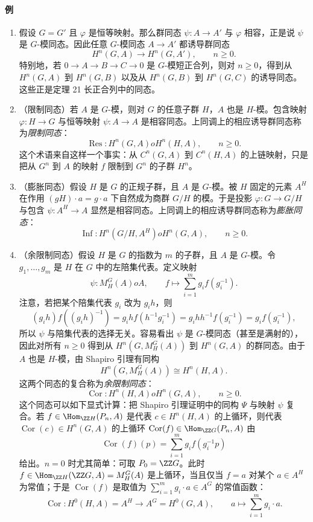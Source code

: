 \paragraph{例}
\begin{enumerate}[label=(\arabic*)]
  \item 假设 $G=G'$ 且 $\varphi$ 是恒等映射。那么群同态 $\psi:A\to A'$ 与 $\varphi$ 相容，正是说 $\psi$ 是 $G$-模同态。因此任意 $G$-模同态 $A\to A'$ 都诱导群同态
  \[
    H^n(G,A)\to H^n(G,A'),
    \qquad n\geq0.
  \]
  特别地，若 $0\to A\to B\to C\to0$ 是 $G$-模短正合列，则对 $n\geq0$，得到从 $H^n(G,A)$ 到 $H^n(G,B)$ 以及从 $H^n(G,B)$ 到 $H^n(G,C)$ 的诱导同态。这些正是定理 21 长正合列中的同态。

  \item （限制同态）若 $A$ 是 $G$-模，则对 $G$ 的任意子群 $H$，$A$ 也是 $H$-模。包含映射 $\varphi:H\to G$ 与恒等映射 $\psi:A\to A$ 是相容同态。上同调上的相应诱导群同态称为\emph{限制同态}：
  \[
    \operatorname{Res}:H^n(G,A)	o H^n(H,A),
    \qquad n\geq0.
  \]
  这个术语来自这样一个事实：从 $C^n(G,A)$ 到 $C^n(H,A)$ 的上链映射，只是把从 $G^n$ 到 $A$ 的映射 $f$ 限制到 $G^n$ 的子群 $H^n$。

  \item （膨胀同态）假设 $H$ 是 $G$ 的正规子群，且 $A$ 是 $G$-模。被 $H$ 固定的元素 $A^H$ 在作用 $(gH)\cdot a=g\cdot a$ 下自然成为商群 $G/H$ 的模。于是投影 $\varphi:G\to G/H$ 与包含 $\psi:A^H\to A$ 显然是相容同态。上同调上的相应诱导群同态称为\emph{膨胀同态}：
  \[
    \operatorname{Inf}:H^n(G/H,A^H)	o H^n(G,A),
    \qquad n\geq0.
  \]

  \item （余限制同态）假设 $H$ 是 $G$ 的指数为 $m$ 的子群，且 $A$ 是 $G$-模。令 $g_1,
  \ldots,g_m$ 是 $H$ 在 $G$ 中的左陪集代表。定义映射
  \[
    \psi:M_H^G(A)	o A,
    \qquad
    f\mapsto\sum_{i=1}^m g_i f(g_i^{-1}).
  \]
  注意，若把某个陪集代表 $g_i$ 改为 $g_ih$，则
  \[
    (g_ih)f((g_ih)^{-1})=g_ihf(h^{-1}g_i^{-1})=g_ihh^{-1}f(g_i^{-1})=g_if(g_i^{-1}),
  \]
  所以 $\psi$ 与陪集代表的选择无关。容易看出 $\psi$ 是 $G$-模同态（甚至是满射的），因此对所有 $n\geq0$ 得到从 $H^n(G,M_H^G(A))$ 到 $H^n(G,A)$ 的群同态。由于 $A$ 也是 $H$-模，由 Shapiro 引理有同构
  \[
    H^n(G,M_H^G(A))\cong H^n(H,A).
  \]
  这两个同态的复合称为\emph{余限制同态}：
  \[
    \operatorname{Cor}:H^n(H,A)	o H^n(G,A),
    \qquad n\geq0.
  \]
  这个同态可以如下显式计算：把 Shapiro 引理证明中的同构 $\Psi$ 与映射 $\psi$ 复合。若 $f\in\Hom_{
\ZZ H}(P_n,A)$ 是代表 $c\in H^n(H,A)$ 的上循环，则代表 $\operatorname{Cor}(c)\in H^n(G,A)$ 的上循环 $\operatorname{Cor}(f)\in\Hom_{\ZZ G}(P_n,A)$ 由
  \[
    \operatorname{Cor}(f)(p)=\sum_{i=1}^m g_i f(g_i^{-1}p)
  \]
  给出。$n=0$ 时尤其简单：可取 $P_0=\ZZ G$。此时 $f\in\Hom_{\ZZ H}(\ZZ G,A)=M_H^G(A)$ 是上循环，当且仅当 $f=a$ 对某个 $a\in A^H$ 为常值；于是 $\operatorname{Cor}(f)$ 是取值为 $\sum_{i=1}^m g_i\cdot a\in A^G$ 的常值函数：
  \[
    \operatorname{Cor}:H^0(H,A)=A^H\to A^G=H^0(G,A),
    \qquad a\mapsto\sum_{i=1}^m g_i\cdot a.
  \]
\end{enumerate}

